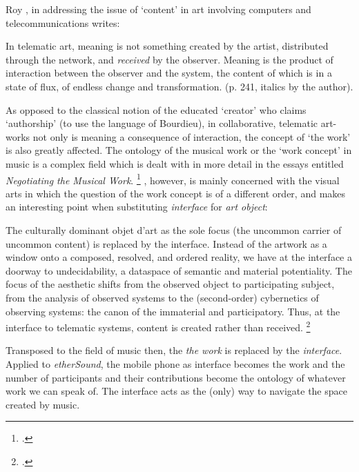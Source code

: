 Roy \citeauthor{Ascott}, in addressing the issue of `content' in art involving computers and telecommunications writes:
\begin{squote}   In telematic art, meaning is not something created by the artist,   distributed through the network, and \emph{received} by the   observer. Meaning is the product of interaction between the observer   and the system, the content of which is in a state of flux, of   endless change and transformation. (p. 241, italics by the author).
\end{squote}
As opposed to the classical notion of the educated `creator' who claims `authorship' (to use the language of Bourdieu), in collaborative, telematic art-works not only is meaning a consequence of interaction, the concept of `the work' is also greatly affected. The ontology of the musical work or the `work concept' in music is a complex field which is dealt with in more detail in the essays entitled \emph{Negotiating the Musical Work}. \footcite{frisk-ost06,frisk-ost06-2} \citeauthor{Ascott}, however, is mainly concerned with the visual arts in which the question of the work concept is of a different order, and makes an interesting point when substituting \textit{interface} for \textit{art object}:
\begin{squote}
The culturally dominant objet d'art as the sole focus (the uncommon   carrier of uncommon content) is replaced by the interface. Instead   of the artwork as a window onto a composed, resolved, and ordered   reality, we have at the interface a doorway to undecidability, a   dataspace of semantic and material potentiality. The focus of the   aesthetic shifts from the observed object to participating subject,   from the analysis of observed systems to the (second-order)   cybernetics of observing systems: the canon of the immaterial and   participatory. Thus, at the interface to telematic systems, content   is created rather than received.
\footcite[242]{Ascott}
\end{squote} 
Transposed to the field of music then, the \emph{the work} is replaced by the \emph{interface}. Applied to \emph{etherSound}, the mobile phone as interface becomes the work and the number of participants and their contributions become the ontology of whatever work we can speak of. The interface acts as the (only) way to navigate the space created by music.

